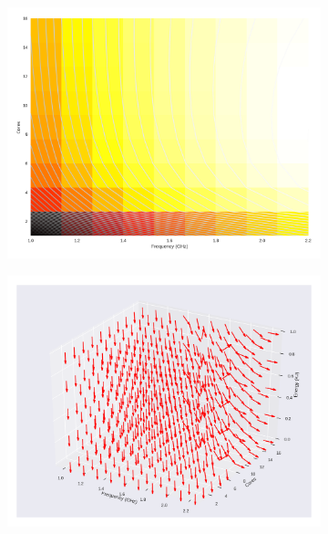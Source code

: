 \begin{figure}[H]
	\centering
	\begin{subfigure}[b]{0.45\textwidth}
		\includegraphics[width=\textwidth]{models/figures/analisys/pleak0.png}
	\end{subfigure}
	\begin{subfigure}[b]{0.45\textwidth}
		\includegraphics[width=\textwidth]{models/figures/analisys/pleak0_3d.png}
	\end{subfigure}
\end{figure}

